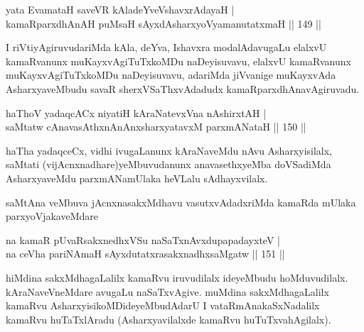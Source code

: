 
\begin{shl}
yata EvamataH saveVR kAladeYveVshavxrAdayaH |\\
kamaRparxdhAnAH puMsaH sAyxdAsharxyoV\s yamanutatxmaH \hfill || 149 ||
\end{shl}

\begin{artha}
I riVtiyAgiruvudariMda kAla, deYva, Ishavxra modalAdavugaLu elalxvU kamaRvanunx muKayxvAgiTuTxkoMDu naDeyisuvavu, elalxvU kamaRvanunx muKayxvAgiTuTxkoMDu naDeyisuvavu, adariMda jiVvanige muKayxvAda AsharxyaveMbudu savaR sherxVSaThxvAdadudx kamaRparxdhAnavAgiruvadu.
\end{artha}

\begin{shl}
\footnotemark{}haThoV yadaqcACx niyatiH kAraNatevxVna nA\s \s shirxtAH |\\
saMtatw cAnavasAthxnAnAnx\s \s sharxyatavxM parxmANataH \hfill || 150 ||
\end{shl}

\begin{artha}
haTha yadaqceCx, vidhi ivugaLanunx kAraNaveMdu nAvu Asharxyisilalx, saMtati (vijAcnxnadhare)yeMbuvudanunx anavasethxyeMba doVSadiMda AsharxyaveMdu parxmANamUlaka heVLalu sAdhayxvilalx.
\end{artha}


\begin{artha}
saMtAna veMbuva jAcnxnasakxMdhavu vasutxvAdadxriMda kamaRda mUlaka parxyoVjakaveMdare
\end{artha}

\begin{shl}
na kamaR pUvaRsakxnedhxVSu naSaTxnAvxdupapadayxteV |\\
na ceVha pariNAmaH sAyxdutatxrasakxnadhxsaMgatw \hfill || 151 ||
\end{shl}

\begin{artha}
hiMdina sakxMdhagaLalilx kamaRvu iruvudilalx ideyeMbudu hoMduvudilalx. kAraNaveVneMdare avugaLu naSaTxvAgive. muMdina sakxMdhagaLalilx kamaRvu AsharxyisikoMDideyeMbudAdarU I vataRmAnakaSxNadalilx kamaRvu huTaTxlAradu (Asharxyavilalxde kamaRvu huTuTxvahAgilalx).
\end{artha}

